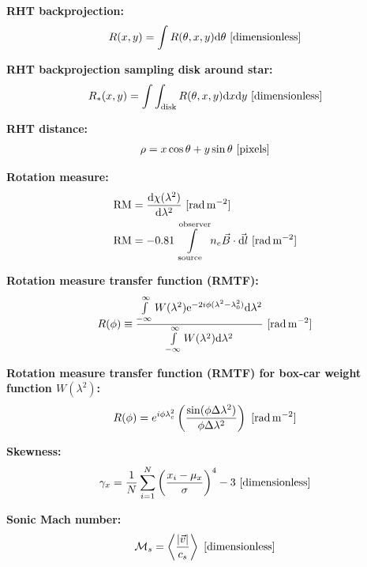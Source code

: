 \documentclass[a4paper,10pt]{article}
\begin{document}
{\noindent}\textbf{RHT backprojection:}
\begin{align*}
    R(x,y) = \int R(\theta,x,y)\mathrm{d}\theta ~ [{\rm dimensionless}]
\end{align*}

{\noindent}\textbf{RHT backprojection sampling disk around star:}
\begin{align*}
    R_*(x,y) = \int\int_\mathrm{disk} R(\theta,x,y)\mathrm{d}x\mathrm{d}y ~ [{\rm dimensionless}]
\end{align*}

{\noindent}\textbf{RHT distance:}
\begin{align*}
    \rho = x\cos\theta+y\sin\theta ~ [{\rm pixels}]
\end{align*}

{\noindent}\textbf{Rotation measure:}
\begin{align*}
{\rm RM} &= \dfrac{\mathrm{d}\chi(\lambda^2)}{\mathrm{d}\lambda^2} ~ [{\rm rad\,m^{-2}}] \\
\mathrm{RM}& = -0.81 \int\limits_\mathrm{source}^\mathrm{observer} n_e \vec{B}\cdot\vec{{\rm d}l} ~ [{\rm rad\,m^{-2}}]
\end{align*}

{\noindent}\textbf{Rotation measure transfer function (RMTF):}
\begin{align*}
R(\phi) \equiv \dfrac{\int\limits_{-\infty}^\infty W(\lambda^2)\mathrm{e}^{-2i\phi(\lambda^2-\lambda_0^2)}\mathrm{d}\lambda^2}{\int\limits_{-\infty}^\infty W(\lambda^2)\mathrm{d}\lambda^2} ~ [{\rm rad\,m^{-2}}]
\end{align*}

{\noindent}\textbf{Rotation measure transfer function (RMTF) for box-car weight function $W(\lambda^2)$:}
\begin{align*}
    R(\phi) = e^{i\phi\lambda_c^2}\left(\dfrac{\sin(\phi\Delta\lambda^2)}{\phi\Delta\lambda^2}\right) ~ [{\rm rad\,m^{-2}}]
\end{align*}

{\noindent}\textbf{Skewness:}
\begin{align*}
    \gamma_x = \frac{1}{N} \sum_{i=1}^N \left(\frac{x_i-\mu_x}{\sigma}\right)^4 -3 ~ [{\rm dimensionless}]
\end{align*}

{\noindent}\textbf{Sonic Mach number:}
\begin{align*}
    \mathcal{M}_s = \left\langle\frac{\lvert\vec{v}\rvert}{c_s}\right\rangle ~ [{\rm dimensionless}]
\end{align*}
\end{document}
